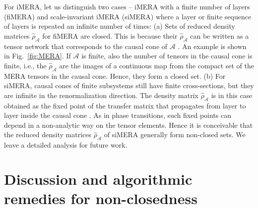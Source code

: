 \documentclass[english,11pt,aps,pra,onecolumn,tightenlines,groupedaddress,superscriptaddress,notitlepage,floatfix,fleqn]{revtex4-1}
\newcommand{\dm}{{\hat{\rho}}}
\newcommand{\mc}[1]{\mathcal{#1}}
\newcommand{\A}{\mc{A}}
\begin{document}
For iMERA, let us distinguish two cases -- iMERA with a finite number of layers (fiMERA) and scale-invariant iMERA (siMERA) where a layer or finite sequence of layers is repeated an infinite number of times:
(a) Sets of reduced density matrices $\dm_\A$ for fiMERA are closed. This is because their $\dm_\A$ can be written as a tensor network that corresponds to the causal cone of $\A$ \cite{Vidal2007-98,Vidal2006}. An example is shown in Fig.~\ref{fig:MERA}. If $\A$ is finite, also the number of tensors in the causal cone is finite, i.e., the $\dm_\A$ are the images of a continuous map from the compact set of the MERA tensors in the causal cone. Hence, they form a closed set.
(b) For siMERA, causal cones of finite subsystems still have finite cross-sections, but they are infinite in the renormalization direction. The density matrix $\dm_\A$ is in this case obtained as the fixed point of the transfer matrix that propagates from layer to layer inside the causal cone \cite{Evenbly2009-79,Montangero2008-10}. As in phase transitions, such fixed points can depend in a non-analytic way on the tensor elements. Hence it is conceivable that the reduced density matrices $\dm_\A$ of siMERA generally form non-closed sets. We leave a detailed analysis for future work.


\section{Discussion and algorithmic remedies for non-closedness}\label{sec:discuss}
\end{document}
